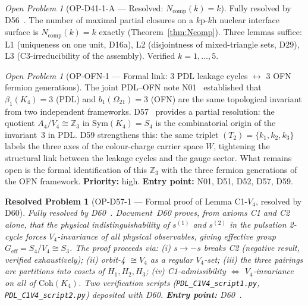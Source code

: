 \documentclass[11pt,a4paper]{article}
\newtheorem{resolvedproblem}{Resolved Problem}
\theoremstyle{plain}
\theoremstyle{definition}
\theoremstyle{remark}
\newtheorem{openproblem}[theorem]{Open Problem}
\newcommand{\Kfour}{K_4}
\begin{document}
\begin{openproblem}[OP-D41-1-A --- Resolved: $N_{\mathrm{comp}}(k)=k$]
\label{op:Ncomp}
\textcolor{proofblue}{Fully resolved by D56~\cite{D56}.} The number of maximal partial closures on a $k\mathrm{p}$-$k\mathrm{h}$ nuclear interface surface is $N_{\mathrm{comp}}(k)=k$ exactly (Theorem~\ref{thm:Ncomp}). Three lemmas suffice: L1 (uniqueness on one unit, D16a), L2 (disjointness of mixed-triangle sets, D29), L3 (C3-irreducibility of the assembly). Verified $k=1,\ldots,5$.
\end{openproblem}

\begin{openproblem}[OP-OFN-1 --- Formal link: 3 PDL leakage cycles $\leftrightarrow$ 3 OFN fermion generations]
\label{op:OFN1}
The joint PDL--OFN note N01~\cite{N01} established that $\beta_1(\Kfour)=3$ (PDL) and $b_1(\Omega_{21})=3$ (OFN) are the same topological invariant from two independent frameworks. D57~\cite{D57} provides a partial resolution: the quotient $A_4/V_4 \cong \mathbb{Z}_3$ in $\mathrm{Sym}(\Kfour)=S_4$ is the combinatorial origin of the invariant~3 in PDL. D59 strengthens this: the same triplet $(T_2) = \{k_1,k_2,k_3\}$ labels the three axes of the colour-charge carrier space $W$, tightening the structural link between the leakage cycles and the gauge sector. What remains open is the formal identification of this $\mathbb{Z}_3$ with the three fermion generations of the OFN framework. \textbf{Priority:} high. \textbf{Entry point:} N01, D51, D52, D57, D59.
\end{openproblem}

\begin{resolvedproblem}[OP-D57-1 --- Formal proof of Lemma C1-$V_4$, resolved by D60]
\label{op:C1V4}
\textcolor{proofblue}{Fully resolved by D60~\cite{D60}.} Document~D60 proves, from axioms C1 and C2 alone, that the physical indistinguishability of $s^{(1)}$ and $s^{(2)}$ in the pulsation 2-cycle forces $V_4$-invariance of all physical observables, giving effective group $G_{\mathrm{eff}} = S_4/V_4 \cong S_3$. The proof proceeds via: (i) $s \to -s$ breaks C2 (negative result, verified exhaustively); (ii) orbit-4 $\cong V_4$ as a regular $V_4$-set; (iii) the three pairings are partitions into cosets of $H_1, H_2, H_3$; (iv) C1-admissibility $\Leftrightarrow$ $V_4$-invariance on all of $\mathrm{Coh}(K_4)$. Two verification scripts (\texttt{PDL\_C1V4\_script1.py}, \texttt{PDL\_C1V4\_script2.py}) deposited with D60. \textbf{Entry point:} D60~\cite{D60}.
\end{resolvedproblem}
\end{document}
